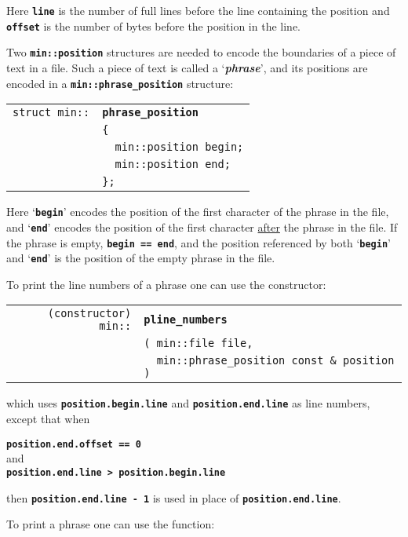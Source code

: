 \documentclass[12pt]{article}
\makeatletter
\newcommand{\TT}[1]{{\tt \bfseries #1}}
\newcommand{\key}[1]{{\bf \em #1}\index{#1}}
\newcommand{\ttindex}[1]{\index{#1@{\tt #1}}}
\newcommand{\ttmindex}[2]{\index{#1@{\tt #1}!#2}}
\newcommand{\EOL}{\penalty \exhyphenpenalty}
\newenvironment{indpar}[1][0.3in]%
	{\begin{list}{}%
		     {\setlength{\itemsep}{0in}%
		      \setlength{\topsep}{0in}%
		      \setlength{\parsep}{1ex}%
		      \setlength{\labelwidth}{#1}%
		      \setlength{\leftmargin}{#1}%
		      \addtolength{\leftmargin}{\labelsep}}%
	 \item}%
	{\end{list}}
\newcommand{\LABEL}[1]{\label{#1}}
\newlength{\ARGBREAKLENGTH}
\newcommand{\ARGBREAK}[1][\ARGBREAKLENGTH]{\\&\hspace*{#1}}
\newcommand{\MINKEY}[1]%
	   {\TT{#1}\ttindex{min::#1}\ttindex{#1}}
\makeatother
\begin{document}
Here \TT{line} is the number of full lines before the line
containing the position and \TT{offset} is the
number of bytes before the position in the line.

Two \TT{min::position} structures are needed to encode the boundaries
of a piece of text in a file.  Such a piece of text is called
a `\key{phrase}', and its positions are encoded in a
\TT{min::\EOL phrase\_\EOL position} structure:

\begin{indpar}[1em]\begin{tabular}{r@{}l}
\verb|struct min::| & \MINKEY{phrase\_\EOL position}\ARGBREAK
    \verb|{|\ARGBREAK
    \verb|  min::position begin;|\ARGBREAK
    \verb|  min::position end;|\ARGBREAK
    \verb|};|
\ttmindex{begin}{in {\tt min::phrase\_position}}
\ttmindex{end}{in {\tt min::phrase\_position}}
\LABEL{MIN::PHRASE_POSITION_STRUCT} \\
\end{tabular}\end{indpar}

Here `\TT{begin}' encodes the position of the first character
of the phrase in the file, and `\TT{end}' encodes the position
of the first character \underline{after} the phrase in the file.
If the phrase is empty, \TT{begin == end}, and the position
referenced by both `\TT{begin}' and `\TT{end}'
is the position of the empty phrase in the file.

To print the line numbers of a phrase one can use the constructor:

\begin{indpar}[1em]\begin{tabular}{r@{}l}
\verb|(constructor) min::| & \MINKEY{pline\_numbers}\ARGBREAK
    \verb|( min::file file,|\ARGBREAK
    \verb|  min::phrase_position const & position )|
\LABEL{MIN::PLINE_NUMBERS_OF_PHRASE_POSITION} \\
\end{tabular}\end{indpar}

which uses \TT{position.begin.line} and
\TT{position.end.line} as
line numbers, except that when
\begin{center}
\TT{position.end.offset == 0} \\
and \\
\TT{position.end.line > position.begin.line}
\end{center}
then \TT{position.end.line - 1} is used in place of
\TT{position.end.line}.

To print a phrase one can use the function:
\end{document}
